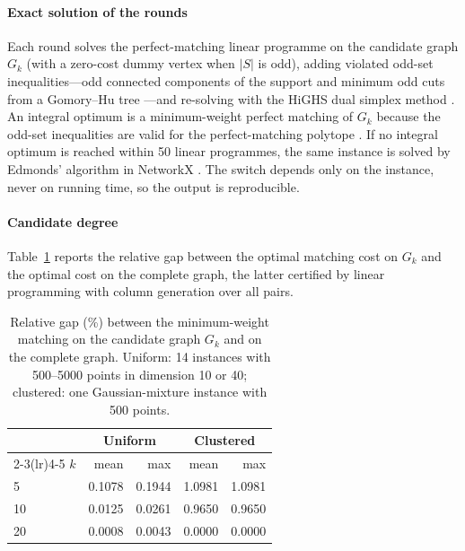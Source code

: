 \paragraph{Exact solution of the \MUSCO{} rounds} Each round solves the perfect-matching linear programme on the candidate graph $G_k$ (with a zero-cost dummy vertex when $|S|$ is odd), adding violated odd-set inequalities---odd connected components of the support and minimum odd cuts from a Gomory--Hu tree \citep{padberg1982odd,gomory1961multi}---and re-solving with the HiGHS dual simplex method \citep{huangfu2018parallelizing}. An integral optimum is a minimum-weight perfect matching of $G_k$ because the odd-set inequalities are valid for the perfect-matching polytope \citep{edmonds1965maximum,grotschel1985solving}. If no integral optimum is reached within 50 linear programmes, the same instance is solved by Edmonds' algorithm in NetworkX \citep{hagberg2008exploring}. The switch depends only on the instance, never on running time, so the output is reproducible.

\paragraph{Candidate degree} Table~\ref{tab:ksweep} reports the relative gap between the optimal matching cost on $G_k$ and the optimal cost on the complete graph, the latter certified by linear programming with column generation over all pairs.

\begin{table}[htbp]
\centering
\caption{Relative gap (\%) between the minimum-weight matching on the candidate graph $G_k$ and on the complete graph. Uniform: 14 instances with 500--5000 points in dimension 10 or 40; clustered: one Gaussian-mixture instance with 500 points.}\label{tab:ksweep}
\small
\begin{tabular}{@{}lrrrr@{}}
\toprule
 & \multicolumn{2}{c}{Uniform} & \multicolumn{2}{c}{Clustered} \\
\cmidrule(lr){2-3}\cmidrule(lr){4-5}
$k$ & mean & max & mean & max \\
\midrule
5  & 0.1078 & 0.1944 & 1.0981 & 1.0981 \\
10 & 0.0125 & 0.0261 & 0.9650 & 0.9650 \\
20 & 0.0008 & 0.0043 & 0.0000 & 0.0000 \\
\bottomrule
\end{tabular}
\end{table}
